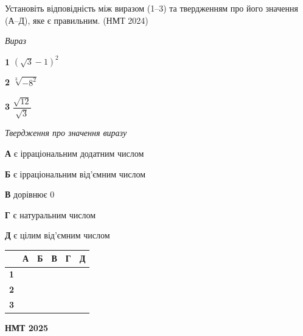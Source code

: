 \documentclass[14pt]{extarticle}
\newcommand{\matchTable}{
\begin{tabular}{|>{\centering\arraybackslash}p{0.25cm}|*{5}{>{\centering\arraybackslash}p{0.25cm}|}}
\hline
& \scriptsize\textbf{А} & \scriptsize\textbf{Б} & \scriptsize\textbf{В} & \scriptsize\textbf{Г} & \scriptsize\textbf{Д} \\
\hline
\scriptsize\textbf{1} & \rule{0pt}{0.25cm} & & & & \\
\hline
\scriptsize\textbf{2} & \rule{0pt}{0.25cm} & & & & \\
\hline
\scriptsize\textbf{3} & \rule{0pt}{0.25cm} & & & & \\
\hline
\end{tabular}
}
\newcommand{\task}[2]{\noindent\makebox[1.5em][l]{\textbf{#1.}}\parbox[t]{\dimexpr\textwidth-1.5em}{#2}}
\newcommand{\nmtyear}[1]{\hfill{\small\color{yearcolor}(НМТ #1)}}
\begin{document}
\vspace{0.5cm}

\task{20}{Установіть відповідність між виразом (1--3) та твердженням про його значення (А--Д), яке є правильним. \nmtyear{2024}}

\vspace{0.3cm}
\noindent
\begin{minipage}[t]{0.2\textwidth}
\vspace{0pt}
\textit{Вираз}

\vspace{0.2cm}
\textbf{1} \quad $(\sqrt{3} - 1)^2$

\vspace{0.3cm}
\textbf{2} \quad $\sqrt[3]{-8^2}$

\vspace{0.3cm}
\textbf{3} \quad $\dfrac{\sqrt{12}}{\sqrt{3}}$
\end{minipage}
\hfill
\begin{minipage}[t]{0.5\textwidth}
\vspace{0pt}
\textit{Твердження про значення виразу}

\vspace{0.2cm}
\textbf{А} \quad є ірраціональним додатним числом

\vspace{0.2cm}
\textbf{Б} \quad є ірраціональним від'ємним числом

\vspace{0.2cm}
\textbf{В} \quad дорівнює 0

\vspace{0.2cm}
\textbf{Г} \quad є натуральним числом

\vspace{0.2cm}
\textbf{Д} \quad є цілим від'ємним числом
\end{minipage}
\hfill
\begin{minipage}[t]{0.18\textwidth}
\vspace{0pt}
\matchTable
\end{minipage}


\begin{center}
{\Large\textbf{\color{headerblue}НМТ 2025}}
\end{center}

\vspace{0.5cm}
\end{document}
